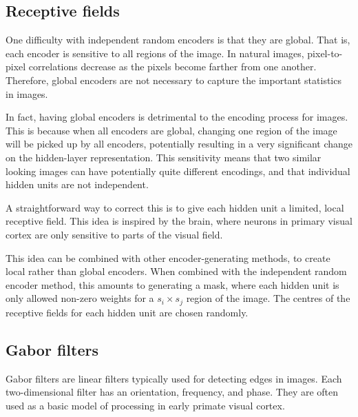 \subsection{Receptive fields}

One difficulty with independent random encoders is that they are global.
That is, each encoder is sensitive to all regions of the image.
In natural images, pixel-to-pixel correlations decrease
as the pixels become farther from one another.
Therefore, global encoders are not necessary to capture
the important statistics in images.

In fact, having global encoders is detrimental to the encoding process for images.
This is because when all encoders are global,
changing one region of the image will be picked up by all encoders,
potentially resulting in a very significant change on the hidden-layer representation.
This sensitivity means that two similar looking images can have potentially
quite different encodings,
and that individual hidden units are not independent.

A straightforward way to correct this is to give each hidden unit
a limited, local receptive field.
This idea is inspired by the brain,
where neurons in primary visual cortex are only sensitive
to parts of the visual field.

This idea can be combined with other encoder-generating methods,
to create local rather than global encoders.
When combined with the independent random encoder method,
this amounts to generating a mask,
where each hidden unit is only allowed non-zero weights
for a $s_i \times s_j$ region of the image.
The centres of the receptive fields for each hidden unit are chosen randomly.


\subsection{Gabor filters}

Gabor filters are linear filters typically used for detecting edges in images.
Each two-dimensional filter has an orientation, frequency, and phase.
They are often used as a basic model of processing
in early primate visual cortex.

